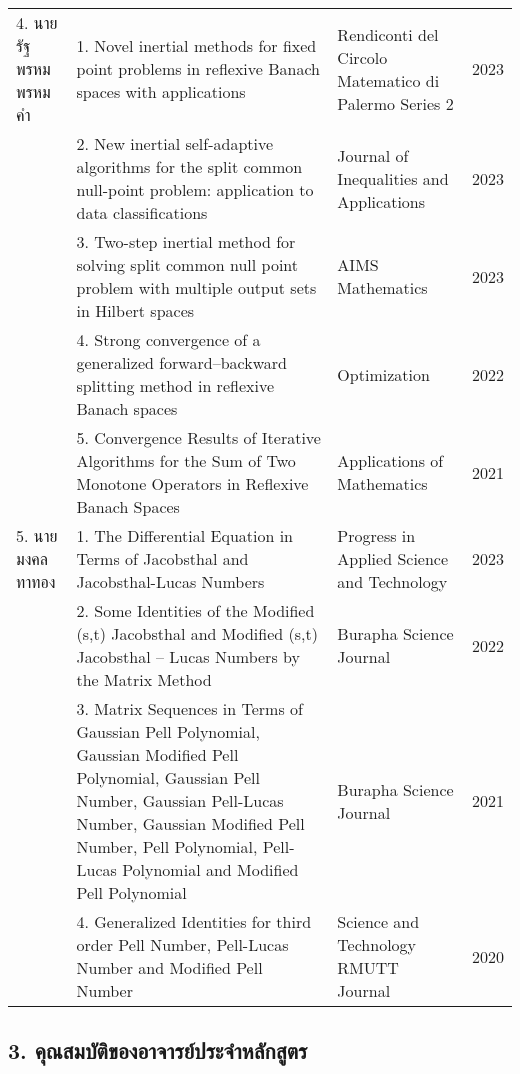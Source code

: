 {\begin{center}
\begin{longtable}{|p{}|p{}|p{}|p{}|}
4. นายรัฐพรหม พรหมคำ&1. Novel inertial methods for fixed point problems in reflexive Banach spaces with applications
&Rendiconti del Circolo Matematico di Palermo Series 2
&2023 \\ \cline{2-4}

&2. New inertial self-adaptive algorithms for the split common null-point problem: application to data classifications
&Journal of Inequalities and Applications
&2023 \\ \cline{2-4}

&3. Two-step inertial method
for solving split common 
null point problem with 
multiple output sets in Hilbert spaces
&AIMS Mathematics
&2023 \\ \cline{2-4}

&4. Strong convergence of a
generalized forward–backward
splitting method in 
reflexive Banach spaces
&Optimization
&2022 \\ \cline{2-4}

&5. Convergence Results of Iterative Algorithms for the Sum of Two Monotone Operators in Reflexive Banach Spaces
&Applications  of Mathematics
&2021 \\ \cline{2-4}

5. นายมงคล ทาทอง
&1. The Differential Equation in Terms of Jacobsthal and Jacobsthal-Lucas Numbers
&Progress in Applied Science and Technology
&2023 \\ \cline{2-4}

&2. Some Identities of the Modified (s,t) Jacobsthal and 
Modified (s,t) Jacobsthal – Lucas Numbers by the Matrix Method 
&Burapha Science Journal
&2022 \\  \cline{2-4}

&3. Matrix Sequences in Terms
of Gaussian Pell Polynomial,
Gaussian Modified Pell Polynomial,
Gaussian Pell Number, 
Gaussian Pell-Lucas Number,
Gaussian Modified Pell Number,
Pell Polynomial, Pell-Lucas Polynomial 
and Modified Pell Polynomial
&Burapha Science Journal
&2021 \\ \cline{2-4}

&4. Generalized Identities for 
third order Pell Number,
Pell-Lucas Number 
and Modified Pell Number
&Science and Technology RMUTT Journal
&2020 \\ \hline

\end{longtable}
\end{center}

\printselfeval

\subsection*{3. คุณสมบัติของอาจารย์ประจำหลักสูตร}

}
